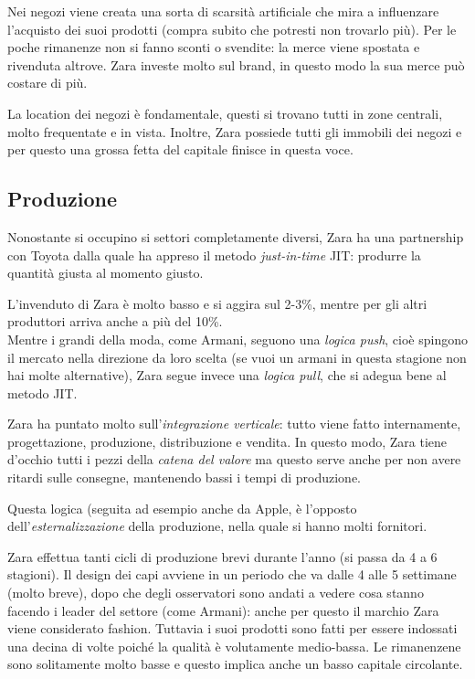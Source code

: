 \documentclass[a4paper,portrait,12pt]{article}
\theoremstyle{definition}
\begin{document}
Nei negozi viene creata una sorta di scarsità artificiale che mira a influenzare l'acquisto dei suoi prodotti (compra subito che potresti non trovarlo più).
Per le poche rimanenze non si fanno sconti o svendite: la merce viene spostata e rivenduta altrove.
Zara investe molto sul brand, in questo modo la sua merce può costare di più.

La location dei negozi è fondamentale, questi si trovano tutti in zone centrali, molto frequentate e in vista.
Inoltre, Zara possiede tutti gli immobili dei negozi e per questo una grossa fetta del capitale finisce in questa voce.

\subsection{Produzione}

Nonostante si occupino si settori completamente diversi, Zara ha una partnership con Toyota dalla quale ha appreso il metodo \emph{just-in-time} JIT: produrre la quantità giusta al momento giusto.

L'invenduto di Zara è molto basso e si aggira sul 2-3\%, mentre per gli altri produttori arriva anche a più del 10\%.\\

Mentre i grandi della moda, come Armani, seguono una \emph{logica push}, cioè spingono il mercato nella direzione da loro scelta (se vuoi un armani in questa stagione non hai molte alternative), Zara segue invece una \emph{logica pull}, che si adegua bene al metodo JIT.

Zara ha puntato molto sull'\emph{integrazione verticale}: tutto viene fatto internamente, progettazione, produzione, distribuzione e vendita.
In questo modo, Zara tiene d'occhio tutti i pezzi della \emph{catena del valore} ma questo serve anche per non avere ritardi sulle consegne, mantenendo bassi i tempi di produzione.

Questa logica (seguita ad esempio anche da Apple, è l'opposto dell'\emph{esternalizzazione} della produzione, nella quale si hanno molti fornitori.

Zara effettua tanti cicli di produzione brevi durante l'anno (si passa da 4 a 6 stagioni).
Il design dei capi avviene in un periodo che va dalle 4 alle 5 settimane (molto breve), dopo che degli osservatori sono andati a vedere cosa stanno facendo i leader del settore (come Armani): anche per questo il marchio Zara viene considerato fashion.
Tuttavia i suoi prodotti sono fatti per essere indossati una decina di volte poiché la qualità è volutamente medio-bassa.
Le rimanenzene sono solitamente molto basse e questo implica anche un basso capitale circolante.
\end{document}
